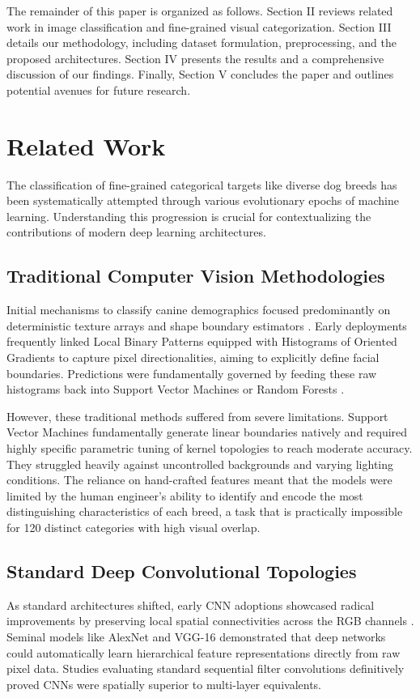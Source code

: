 \documentclass[conference]{IEEEtran}
\begin{document}
The remainder of this paper is organized as follows. Section II reviews related work in image classification and fine-grained visual categorization. Section III details our methodology, including dataset formulation, preprocessing, and the proposed architectures. Section IV presents the results and a comprehensive discussion of our findings. Finally, Section V concludes the paper and outlines potential avenues for future research.

\section{Related Work}
The classification of fine-grained categorical targets like diverse dog breeds has been systematically attempted through various evolutionary epochs of machine learning. Understanding this progression is crucial for contextualizing the contributions of modern deep learning architectures.

\subsection{Traditional Computer Vision Methodologies}
Initial mechanisms to classify canine demographics focused predominantly on deterministic texture arrays and shape boundary estimators \cite{b1}. Early deployments frequently linked Local Binary Patterns equipped with Histograms of Oriented Gradients to capture pixel directionalities, aiming to explicitly define facial boundaries. Predictions were fundamentally governed by feeding these raw histograms back into Support Vector Machines or Random Forests \cite{b2}. 

However, these traditional methods suffered from severe limitations. Support Vector Machines fundamentally generate linear boundaries natively and required highly specific parametric tuning of kernel topologies to reach moderate accuracy. They struggled heavily against uncontrolled backgrounds and varying lighting conditions. The reliance on hand-crafted features meant that the models were limited by the human engineer's ability to identify and encode the most distinguishing characteristics of each breed, a task that is practically impossible for 120 distinct categories with high visual overlap.

\subsection{Standard Deep Convolutional Topologies}
As standard architectures shifted, early CNN adoptions showcased radical improvements by preserving local spatial connectivities across the RGB channels \cite{b8}. Seminal models like AlexNet \cite{b11} and VGG-16 \cite{b12} demonstrated that deep networks could automatically learn hierarchical feature representations directly from raw pixel data. Studies evaluating standard sequential filter convolutions definitively proved CNNs were spatially superior to multi-layer equivalents. 
\end{document}
